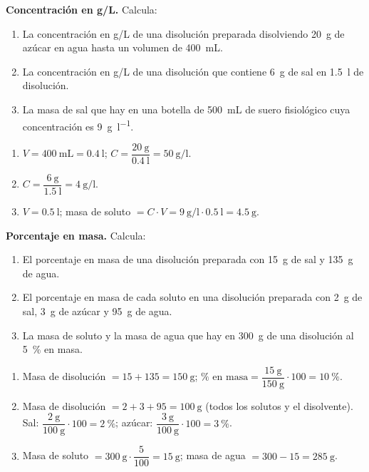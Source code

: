 \begin{exercise}
    \textbf{Concentración en g/L.} Calcula:
    \begin{enumerate}[label=\letraminuscula]
        \item La concentración en g/L de una disolución preparada disolviendo \qty{20}{\g} de azúcar en agua hasta un volumen de \qty{400}{\mL}.
        \item La concentración en g/L de una disolución que contiene \qty{6}{\g} de sal en \qty{1.5}{\litre} de disolución.
        \item La masa de sal que hay en una botella de \qty{500}{\mL} de suero fisiológico cuya concentración es \qty{9}{\g\per\litre}.
    \end{enumerate}
    \begin{solu}
        \begin{enumerate}[label=\alph*)]
            \item \(V = \qty{400}{\mL} = \qty{0.4}{\litre}\); \(C = \dfrac{\qty{20}{\g}}{\qty{0.4}{\litre}} = \qty{50}{\g\per\litre}\).
            \item \(C = \dfrac{\qty{6}{\g}}{\qty{1.5}{\litre}} = \qty{4}{\g\per\litre}\).
            \item \(V = \qty{0.5}{\litre}\); masa de soluto \(= C \cdot V = \qty{9}{\g\per\litre} \cdot \qty{0.5}{\litre} = \qty{4.5}{\g}\).
        \end{enumerate}
    \end{solu}
\end{exercise}

\begin{exercise}
    \textbf{Porcentaje en masa.} Calcula:
    \begin{enumerate}[label=\letraminuscula]
        \item El porcentaje en masa de una disolución preparada con \qty{15}{\g} de sal y \qty{135}{\g} de agua.
        \item El porcentaje en masa de cada soluto en una disolución preparada con \qty{2}{\g} de sal, \qty{3}{\g} de azúcar y \qty{95}{\g} de agua.
        \item La masa de soluto y la masa de agua que hay en \qty{300}{\g} de una disolución al \qty{5}{\percent} en masa.
    \end{enumerate}
    \begin{solu}
        \begin{enumerate}[label=\alph*)]
            \item Masa de disolución \(= 15 + 135 = \qty{150}{\g}\); \(\%\text{ en masa} = \dfrac{\qty{15}{\g}}{\qty{150}{\g}} \cdot 100 = \qty{10}{\percent}\).
            \item Masa de disolución \(= 2 + 3 + 95 = \qty{100}{\g}\) (todos los solutos y el disolvente). Sal: \(\dfrac{\qty{2}{\g}}{\qty{100}{\g}} \cdot 100 = \qty{2}{\percent}\); azúcar: \(\dfrac{\qty{3}{\g}}{\qty{100}{\g}} \cdot 100 = \qty{3}{\percent}\).
            \item Masa de soluto \(= \qty{300}{\g} \cdot \dfrac{5}{100} = \qty{15}{\g}\); masa de agua \(= 300 - 15 = \qty{285}{\g}\).
        \end{enumerate}
    \end{solu}
\end{exercise}


